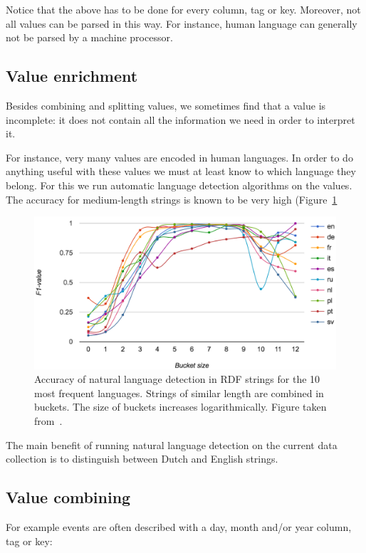 \documentclass[a4paper]{scrartcl}
\begin{document}
Notice that the above has to be done for every column, tag or key.
Moreover, not all values can be parsed in this way.  For instance,
human language can generally not be parsed by a machine processor.


\subsection{Value enrichment}

Besides combining and splitting values, we sometimes find that a value
is incomplete: it does not contain all the information we need in
order to interpret it.

For instance, very many values are encoded in human languages.  In
order to do anything useful with these values we must at least know to
which language they belong.  For this we run automatic language
detection algorithms on the values.  The accuracy for medium-length
strings is known to be very high (Figure~\ref{fig:natlang}

\begin{figure}
  \includegraphics[width=\linewidth]{img/natlang.png}
  \caption{Accuracy of natural language detection in RDF strings for
    the 10 most frequent languages.  Strings of similar length are
    combined in buckets.  The size of buckets increases
    logarithmically.  Figure taken from~\cite{Beek2016c}.}
  \label{fig:natlang}
\end{figure}

The main benefit of running natural language detection on the current
data collection is to distinguish between Dutch and English strings.


\subsection{Value combining}

For example events are often described with a day, month and/or year
column, tag or key:
\end{document}
